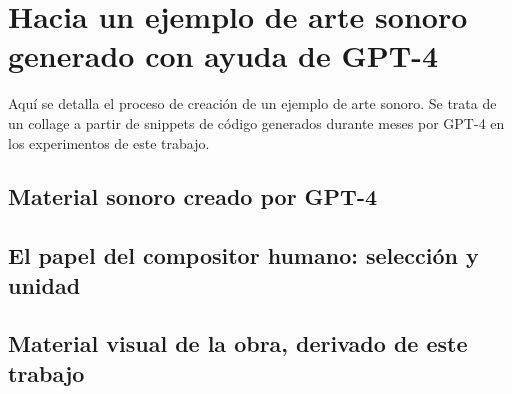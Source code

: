 \chapter{Hacia un ejemplo de arte sonoro generado con ayuda de GPT-4}

Aquí se detalla el proceso de creación de un ejemplo de arte sonoro. Se trata de un collage a partir de snippets de código generados durante meses por GPT-4 en los experimentos de este trabajo.

\section{Material sonoro creado por GPT-4}

\section{El papel del compositor humano: selección y unidad}

\section{Material visual de la obra, derivado de este trabajo}